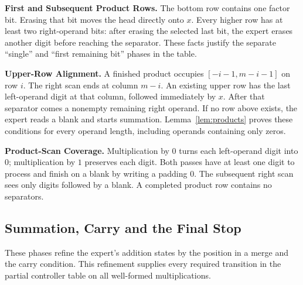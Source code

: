 \documentclass[11pt,a4paper]{article}
\begin{document}
\textbf{First and Subsequent Product Rows.}
The bottom row contains one factor bit. Erasing that bit moves the head
directly onto $x$. Every higher row has at least two right-operand bits:
after erasing the selected last bit, the expert erases another digit
before reaching the separator. These facts justify the separate ``single'' and
``first remaining bit'' phases in the table.

\textbf{Upper-Row Alignment.}
A finished product occupies $[-i-1,m-i-1]$ on row $i$. The right scan
ends at column $m-i$. An existing upper row has the last left-operand digit
at that column, followed immediately by $x$. After that separator comes
a nonempty remaining right operand. If no row above exists, the expert reads a blank and starts summation. Lemma~\ref{lem:products} proves these
conditions for every operand length, including operands containing only zeros.

\textbf{Product-Scan Coverage.}
Multiplication by $0$ turns each left-operand digit into $0$; multiplication
by $1$ preserves each digit. Both passes have at least one digit to process and
finish on a blank by writing a padding $0$. The subsequent right scan sees
only digits followed by a blank. A completed product row contains no separators.

\newpage
\subsection{Summation, Carry and the Final Stop}\label{sec:part5}
These phases refine the expert's addition states by the position in a
merge and the carry condition. This refinement supplies every required transition in the partial controller table on all well-formed multiplications.
\end{document}
